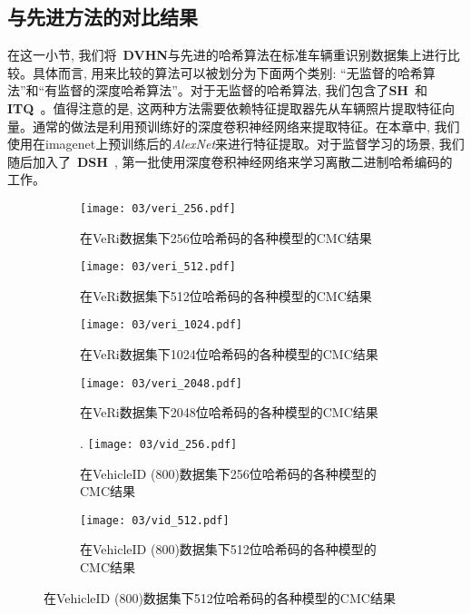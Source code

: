 \subsection{与先进方法的对比结果}
在这一小节, 我们将~\textbf{DVHN}与先进的哈希算法在标准车辆重识别数据集上进行比较。具体而言, 用来比较的算法可以被划分为下面两个类别: ``无监督的哈希算法''和``有监督的深度哈希算法''。对于无监督的哈希算法, 我们包含了\textbf{SH}~\cite{weiss2008spectral}和\textbf{ITQ}~\cite{gong2012iterative}。值得注意的是, 这两种方法需要依赖特征提取器先从车辆照片提取特征向量。通常的做法是利用预训练好的深度卷积神经网络来提取特征。在本章中, 我们使用在imagenet上预训练后的\textit{AlexNet}来进行特征提取。对于监督学习的场景, 我们随后加入了~\textbf{DSH}~\cite{liu2016deep}, 第一批使用深度卷积神经网络来学习离散二进制哈希编码的工作。

\begin{figure}[!htp]
  \centering
  \begin{subfigure}{0.45\textwidth}
    \centering
    \texttt{[image: 03/veri\_256.pdf]}
    \caption{在VeRi数据集下256位哈希码的各种模型的CMC结果}
  \end{subfigure}
  \hspace{1cm}
  \begin{subfigure}{0.45\textwidth}
    \centering
    \texttt{[image: 03/veri\_512.pdf]}
    \caption{在VeRi数据集下512位哈希码的各种模型的CMC结果}
  \end{subfigure}
  \begin{subfigure}{0.45\textwidth}
    \centering
    \texttt{[image: 03/veri\_1024.pdf]}
    \caption{在VeRi数据集下1024位哈希码的各种模型的CMC结果}
  \end{subfigure}
  \hspace{1cm}
  \begin{subfigure}{0.45\textwidth}
    \centering
    \texttt{[image: 03/veri\_2048.pdf]}
    \caption{在VeRi数据集下2048位哈希码的各种模型的CMC结果}
  \end{subfigure}
  \begin{subfigure}{0.45\textwidth} .              
    \centering
    \texttt{[image: 03/vid\_256.pdf]}
    \caption{在VehicleID (800)数据集下256位哈希码的各种模型的CMC结果}
  \end{subfigure}
  \hspace{1cm}
  \begin{subfigure}{0.45\textwidth}
    \centering
    \texttt{[image: 03/vid\_512.pdf]}
    \caption{在VehicleID (800)数据集下512位哈希码的各种模型的CMC结果}
  \end{subfigure}
\end{figure}
